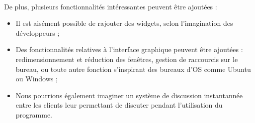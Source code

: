 \paragraph{}
De plus, plusieurs fonctionnalités intéressantes peuvent être ajoutées :
\begin{itemize}
	\item Il est aisément possible de rajouter des widgets, selon l'imagination des développeurs ;
	\item Des fonctionnalités relatives à l'interface graphique peuvent être ajoutées : redimensionnement et réduction des fenêtres, gestion de raccourcis sur le bureau, ou toute autre fonction s'inspirant des bureaux d'OS comme Ubuntu ou Windows ;
	\item Nous pourrions également imaginer un système de discussion instantannée entre les clients leur permettant de discuter pendant l'utilisation du programme.
\end{itemize}


